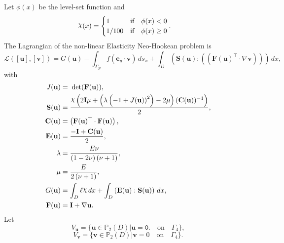 \documentclass[preview]{standalone}
\let\oldcdot\cdot
\let\cdot\oldcdot
\begin{document}
Let $\phi(x)$ be the level-set function and
 \begin{align*}\raisebox{\depth}{$\chi$}(x) &= \begin{cases} 1 & \mbox{if}\quad \phi(x) < 0 \\ 1/100 & \mbox{if}\quad \phi(x)  \ge 0 \end{cases}.\end{align*}
The Lagrangian of the non-linear Elasticity Neo-Hookean problem is
\begin{dmath*}
\mathcal L(\left[ {\mathbf{ u }}\right],\left[ {\mathbf{ v }}\right]) = G({\mathbf{ u }}) -  \int_{\Gamma_N} f \left( \mathbf e_y \cdot {\mathbf{ v }} \right) \,ds_x +  \int_{D} \left( \mathbf S({\mathbf{ u }}) \mathrel{:} \left( \left(  \mathbf F({\mathbf{ u }})^\top  \cdot  \nabla {\mathbf{ v }}  \right) \right)\right) \,dx , 
\end{dmath*}
with 
\begin{align*}
J({\mathbf{ u }}) &=  \;\operatorname{det}(\mathbf F({\mathbf{ u }})) ,\\
\mathbf S({\mathbf{ u }}) &= \frac{\raisebox{\depth}{$\chi$} \left(2 \mathbf{I} \mu + \left(\lambda \left(-1 + {J({\mathbf{ u }}))}^{2}\right) - 2 \mu\right)  (\mathbf C({\mathbf{ u }}))^{-1} \right)}{2},\\
\mathbf C({\mathbf{ u }}) &= \left(  \mathbf F({\mathbf{ u }})^\top  \cdot \mathbf F({\mathbf{ u }}) \right),\\
\mathbf E({\mathbf{ u }}) &= \frac{- \mathbf{I} + \mathbf C({\mathbf{ u }})}{2},\\
\lambda &= \frac{E \nu}{\left(1 - 2 \nu\right) \left(\nu + 1\right)},\\
\mu &= \frac{E}{2 \left(\nu + 1\right)},\\
G({\mathbf{ u }}) &=  \int_{D} \ell \raisebox{\depth}{$\chi$} \,dx +  \int_{D} \left( \mathbf E({\mathbf{ u }}) \mathrel{:} \mathbf S({\mathbf{ u }}) \right) \,dx,\\
\mathbf F({\mathbf{ u }}) &= \mathbf{I} +  \nabla {\mathbf{ u }} .
 \end{align*}
Let
\begin{equation*}
V_{{\mathbf{ u }}} = \{ {\mathbf{ u }} \in \mathbb P_{2}(D)| {\mathbf{ u }} = \mathtt{\text{0.}}  \quad \text{{on}} \quad\Gamma_{4} \},\end{equation*}
\begin{equation*}
V_{{\mathbf{ v }}} = \{ {\mathbf{ v }} \in \mathbb P_{2}(D)| {\mathbf{ v }} = 0  \quad \text{{on}} \quad\Gamma_{4} \}.\end{equation*}
\end{document}
